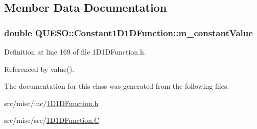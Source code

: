 \subsection{Member Data Documentation}
\hypertarget{class_q_u_e_s_o_1_1_constant1_d1_d_function_aa5aa0e15e78cc350f49894279f896cf6}{
\subsubsection[{m\-\_\-constant\-Value}]{\setlength{\rightskip}{0pt plus 5cm}double Q\-U\-E\-S\-O\-::\-Constant1\-D1\-D\-Function\-::m\-\_\-constant\-Value\hspace{0.3cm}{\ttfamily [protected]}}}\label{class_q_u_e_s_o_1_1_constant1_d1_d_function_aa5aa0e15e78cc350f49894279f896cf6}


Definition at line 169 of file 1\-D1\-D\-Function.\-h.



Referenced by value().



The documentation for this class was generated from the following files\-:\begin{DoxyCompactItemize}
\item 
src/misc/inc/\hyperlink{1_d1_d_function_8h}{1\-D1\-D\-Function.\-h}\item 
src/misc/src/\hyperlink{1_d1_d_function_8_c}{1\-D1\-D\-Function.\-C}\end{DoxyCompactItemize}
